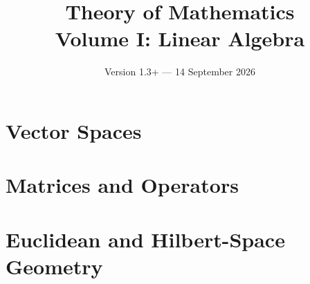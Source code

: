 \documentclass[11pt,a4paper,oneside,openany]{book}
\title{Theory of Mathematics\\[0.5em]\Large Volume I: Linear Algebra}
\author{}
\date{Version 1.3+ --- 14 September 2026}
\begin{document}
\maketitle
\clearpage
\frontmatter
\tableofcontents





\mainmatter

\part{Vector Spaces}







\part{Matrices and Operators}







\part{Euclidean and Hilbert-Space Geometry}








\backmatter


\end{document}
